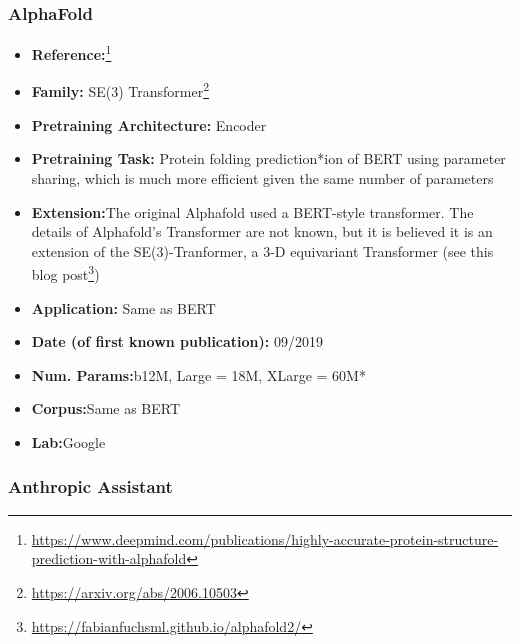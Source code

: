 \documentclass{article}
\begin{document}
\subsubsection{AlphaFold}
            \begin{itemize}
                \item \textbf{Reference:}\footnote{\url{https://www.deepmind.com/publications/highly-accurate-protein-structure-prediction-with-alphafold}}\cite{jumper2021highly}
                \item \textbf{Family:} SE(3) Transformer\footnote{\url{https://arxiv.org/abs/2006.10503}}
                \item \textbf{Pretraining Architecture:} Encoder
                \item \textbf{Pretraining Task:} Protein folding prediction*ion of BERT using parameter sharing, which is much more efficient given the same number of parameters
                \item \textbf{Extension:}The original Alphafold used a BERT-style transformer. The details of Alphafold’s Transformer are not known, but it is believed it is an extension of the SE(3)-Tranformer, a 3-D equivariant Transformer (see this blog post\footnote{\url{https://fabianfuchsml.github.io/alphafold2/}})   
                \item \textbf{Application:} Same as BERT
                \item \textbf{Date (of first known publication):} 09/2019
                \item \textbf{Num. Params:}b12M, Large = 18M, XLarge = 60M*
                \item \textbf{Corpus:}Same as BERT
                \item \textbf{Lab:}Google
            \end{itemize}
            
\subsubsection{Anthropic Assistant}
\end{document}
